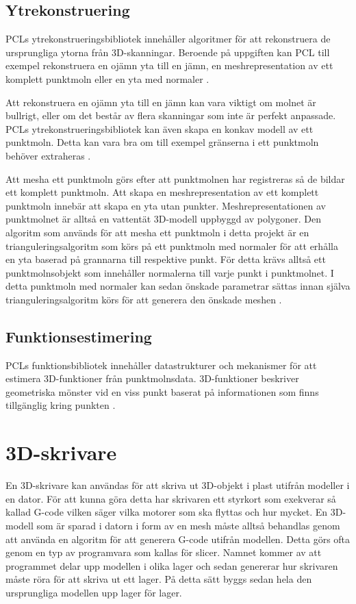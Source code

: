 \subsection{Ytrekonstruering}
PCLs ytrekonstrueringsbibliotek innehåller algoritmer för att rekonstruera de ursprungliga ytorna från 3D-skanningar. Beroende på uppgiften kan PCL till exempel rekonstruera en ojämn yta till en jämn, en meshrepresentation av ett komplett punktmoln eller en yta med normaler \cite{pcl_surface_reconstruction}. 

Att rekonstruera en ojämn yta till en jämn kan vara viktigt om molnet är bullrigt, eller om det består av flera skanningar som inte är perfekt anpassade. PCLs ytrekonstrueringsbibliotek kan även skapa en konkav modell av ett punktmoln. Detta kan vara bra om till exempel gränserna i ett punktmoln behöver extraheras \cite{pcl_surface_reconstruction}.

Att mesha ett punktmoln görs efter att punktmolnen har registreras så de bildar ett komplett punktmoln. Att skapa en meshrepresentation av ett komplett punktmoln innebär att skapa en yta utan punkter. Meshrepresentationen av punktmolnet är alltså en vattentät 3D-modell uppbyggd av polygoner. Den algoritm som används för att mesha ett punktmoln i detta projekt är en trianguleringsalgoritm som körs på ett punktmoln med normaler för att erhålla en yta baserad på grannarna till respektive punkt. För detta krävs alltså ett punktmolnsobjekt som innehåller normalerna till varje punkt i punktmolnet. I detta punktmoln med normaler kan sedan önskade parametrar sättas innan själva trianguleringsalgoritm körs för att generera den önskade meshen \cite{pcl_surface_reconstruction}\cite{pcl_triangulation_algorithm}. 

\subsection{Funktionsestimering}
PCLs funktionsbibliotek innehåller datastrukturer och mekanismer för att estimera 3D-funktioner från punktmolnsdata. 3D-funktioner beskriver geometriska mönster vid en viss punkt baserat på informationen som finns tillgänglig kring punkten \cite{pcl_feature_estimation}.

\section{3D-skrivare}
En 3D-skrivare kan användas för att skriva ut 3D-objekt i plast utifrån modeller i en dator. För att kunna göra detta har skrivaren ett styrkort som exekverar så kallad G-code \cite{gcode} vilken säger vilka motorer som ska flyttas och hur mycket. En 3D-modell som är sparad i datorn i form av en mesh måste alltså behandlas genom att använda en algoritm för att generera G-code utifrån modellen. Detta görs ofta genom en typ av programvara som kallas för slicer. Namnet kommer av att programmet delar upp modellen i olika lager och sedan genererar hur skrivaren måste röra för att skriva ut ett lager. På detta sätt byggs sedan hela den ursprungliga modellen upp lager för lager.


